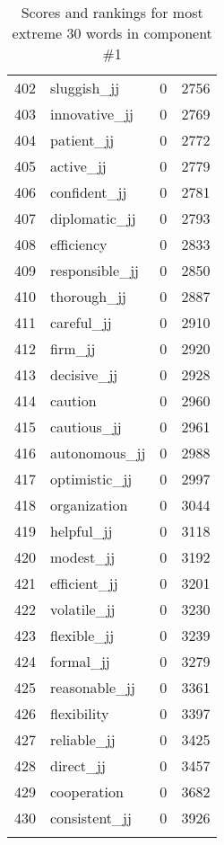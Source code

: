 \begin{longtable}[!htbp]{| rlr@{.}l |}
    402 & sluggish\_jj & 0 & 2756 \\
    403 & innovative\_jj & 0 & 2769 \\
    404 & patient\_jj & 0 & 2772 \\
    405 & active\_jj & 0 & 2779 \\
    406 & confident\_jj & 0 & 2781 \\
    407 & diplomatic\_jj & 0 & 2793 \\
    408 & efficiency & 0 & 2833 \\
    409 & responsible\_jj & 0 & 2850 \\
    410 & thorough\_jj & 0 & 2887 \\
    411 & careful\_jj & 0 & 2910 \\
    412 & firm\_jj & 0 & 2920 \\
    413 & decisive\_jj & 0 & 2928 \\
    414 & caution & 0 & 2960 \\
    415 & cautious\_jj & 0 & 2961 \\
    416 & autonomous\_jj & 0 & 2988 \\
    417 & optimistic\_jj & 0 & 2997 \\
    418 & organization & 0 & 3044 \\
    419 & helpful\_jj & 0 & 3118 \\
    420 & modest\_jj & 0 & 3192 \\
    421 & efficient\_jj & 0 & 3201 \\
    422 & volatile\_jj & 0 & 3230 \\
    423 & flexible\_jj & 0 & 3239 \\
    424 & formal\_jj & 0 & 3279 \\
    425 & reasonable\_jj & 0 & 3361 \\
    426 & flexibility & 0 & 3397 \\
    427 & reliable\_jj & 0 & 3425 \\
    428 & direct\_jj & 0 & 3457 \\
    429 & cooperation & 0 & 3682 \\
    430 & consistent\_jj & 0 & 3926 \\
    \hline
    \caption{Scores and rankings for most extreme 30 words in component \#1} \\
\end{longtable}

